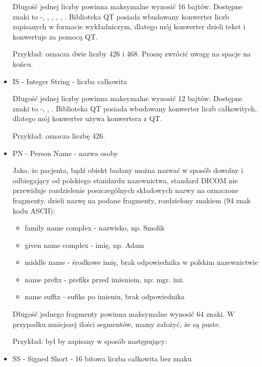 \begin{itemize}
    Długość jednej liczby powinna maksymalne wynosić 16 bajtów.
    Dostępne znaki to -, \quotett{+}, \quotett{-}, , , .
    Biblioteka QT posiada wbudowany konwerter liczb zapisanych w formacie wykładniczym, dlatego mój konwerter dzieli tekst i konwertuje za pomocą QT.
    
    Przykład:  oznacza dwie liczby 426 i 468. Proszę zwrócić uwagę na spacje na końcu.

    \item IS - Integer String - liczba całkowita 

    Długość jednej liczby powinna maksymalne wynosić 12 bajtów.
    Dostępne znaki to -, \quotett{+}, \quotett{-}.
    Biblioteka QT posiada wbudowany konwerter liczb całkowitych, dlatego mój konwerter używa konwertera z QT.
    
    Przykład:   oznacza liczbę 426.

    \item PN - Person Name - nazwa osoby

    Jako, że pacjenta, bądź obiekt badany można nazwać w sposób dowolny i odbiegający od polskiego standardu nazewnictwa, standard DICOM nie przewiduje rozdzielenie poszczególnych składowych nazwy na oznaczone fragmenty.
     dzieli nazwę na podane fragmenty, rozdzielony znakiem \quotett{\^{}} (94 znak kodu ASCII):
    \begin{itemize}
        \item family name complex - nazwisko, np. Smolik
        \item given name complex - imię, np. Adam
        \item middle name - środkowe imię, brak odpowiednika w polskim nazewnictwie
        \item name prefix - prefiks przed imieniem, np: mgr. inż.
        \item name suffix - sufiks po imieniu, brak odpowiednika
    \end{itemize}
    Długość jednego fragmenty powinna maksymalne wynosić 64 znaki.
    W przypadku mniejszej ilości segmentów, mamy założyć, że są puste.
    
    Przykład:  był by zapisany w sposób następujący: 

    \item SS - Signed Short - 16 bitowa liczba całkowita bez znaku
    

\end{itemize}
